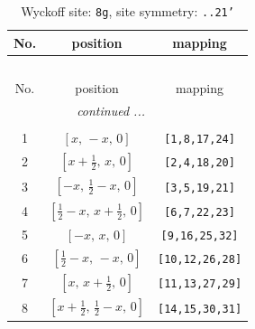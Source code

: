 \documentclass[fleqn,8pt]{jsarticle}
\begin{document}
\renewcommand{\arraystretch}{1.2}
\begin{longtable}{ccc}
\caption{Wyckoff site: {\tt 8g}, site symmetry: {\tt ..21'}}
 \\
 \hline \hline
No. & position & mapping \\ \hline \endfirsthead

\multicolumn{2}{l}{\tablename\ \thetable{}} \\
 \hline \hline
No. & position & mapping \\ \hline \endhead

 \hline \hline
\multicolumn{2}{r}{\footnotesize\it continued ...} \\ \endfoot

 \hline \hline
\multicolumn{2}{r}{} \\ \endlastfoot

1 & $\left[ x,\, - x,\, 0 \right]$ & {\tt [1,8,17,24]} \\ \hline
2 & $\left[ x + \frac{1}{2},\, x,\, 0 \right]$ & {\tt [2,4,18,20]} \\ \hline
3 & $\left[ - x,\, \frac{1}{2} - x,\, 0 \right]$ & {\tt [3,5,19,21]} \\ \hline
4 & $\left[ \frac{1}{2} - x,\, x + \frac{1}{2},\, 0 \right]$ & {\tt [6,7,22,23]} \\ \hline
5 & $\left[ - x,\, x,\, 0 \right]$ & {\tt [9,16,25,32]} \\ \hline
6 & $\left[ \frac{1}{2} - x,\, - x,\, 0 \right]$ & {\tt [10,12,26,28]} \\ \hline
7 & $\left[ x,\, x + \frac{1}{2},\, 0 \right]$ & {\tt [11,13,27,29]} \\ \hline
8 & $\left[ x + \frac{1}{2},\, \frac{1}{2} - x,\, 0 \right]$ & {\tt [14,15,30,31]} \\
\end{longtable}
\renewcommand{\arraystretch}{1.2}
\end{document}
